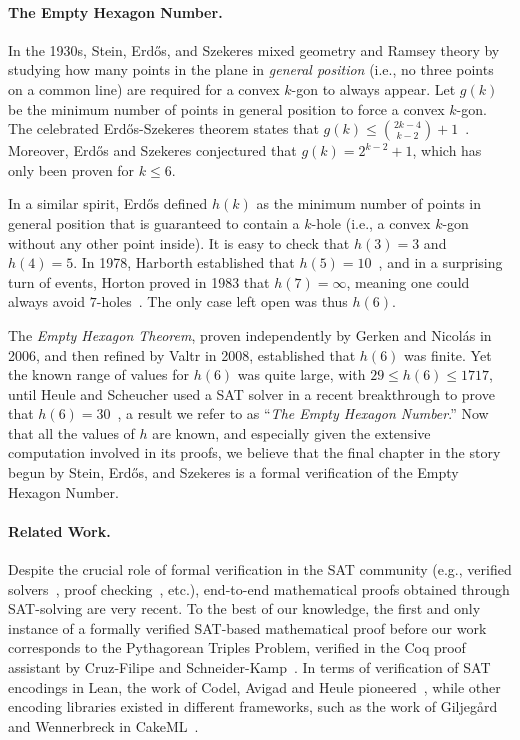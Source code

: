 \paragraph{The Empty Hexagon Number.}
In the 1930s, Stein, Erd\H{o}s, and Szekeres mixed geometry and Ramsey theory by studying how many points in the plane in \emph{general position} (i.e., no three points on a common line) are required for a convex $k$-gon to always appear. Let $g(k)$ be the minimum number of points in general position to force a convex $k$-gon.
The celebrated Erd\H{o}s-Szekeres theorem states that $g(k) \leq \binom{2k-4}{k-2} + 1$~\cite{erdosCombinatorialProblemGeometry2009}. Moreover, Erd\H{o}s and Szekeres conjectured that $g(k) = 2^{k-2} + 1$, which has only been proven for $k \leq 6$.

In a similar spirit, Erd\H{o}s defined $h(k)$ as the minimum number of points in general position that is guaranteed to contain a $k$-hole (i.e., a convex $k$-gon without any other point inside).
It is easy to check that $h(3) = 3$ and $h(4) = 5$. In 1978, Harborth established that $h(5) = 10$~\cite{Harborth1978}, and in a surprising turn of events, Horton proved in 1983 that $h(7) = \infty$, meaning one could always avoid $7$-holes~\cite{hortonSetsNoEmpty1983}. 
The only case left open was thus $h(6)$.

The \emph{Empty Hexagon Theorem}, proven independently by Gerken and Nicolás in 2006, and then refined by Valtr in 2008, established that $h(6)$ was finite.
Yet the known range of values for $h(6)$ was quite large, with $29 \leq h(6) \leq 1717$, until Heule and Scheucher used a SAT solver in a recent breakthrough to prove that $h(6) = 30$~\cite{emptyHexagonNumber}, a result we refer to as ``\emph{The Empty Hexagon Number}.''
Now that all the values of $h$ are known, and especially given the extensive computation involved in its proofs, we believe that the final chapter in the story begun by Stein, Erd\H{o}s, and Szekeres is a formal verification of the Empty Hexagon Number.

\paragraph{Related Work.} Despite the crucial role of formal verification in the SAT community (e.g., verified solvers~\cite{oeVersatVerifiedModern2012,skotam_creusat_2022}, proof checking~\cite{lammichEfficientVerifiedSAT2020,tanVerifiedPropagationRedundancy2023}, etc.), end-to-end mathematical proofs obtained through SAT-solving are very recent. To the best of our knowledge, the first and only instance of a formally verified SAT-based mathematical proof before our work corresponds to the Pythagorean Triples Problem, verified in the \textsf{Coq} proof assistant by Cruz-Filipe and Schneider-Kamp~\cite{formalPythagoreanTriples,LPAR-21:Formally_Proving_Boolean_Pythagorean}. In terms of verification of SAT encodings in Lean, the work of Codel, Avigad and Heule pioneered~\cite{Cayden}, while other encoding libraries existed in different frameworks, such as the work of Giljeg\r{a}rd and Wennerbreck in \textsf{CakeML}~\cite{GilAndWennerbeck}.


